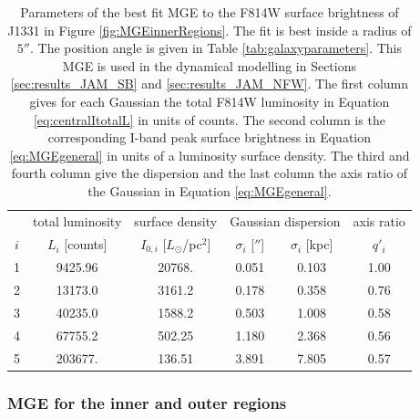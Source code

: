 \documentclass[useAMS,usenatbib]{mnras}
\begin{document}
\begin{table}
\centering
\caption{Parameters of the best fit MGE to the F814W surface brightness of J1331 in Figure \ref{fig:MGEinnerRegions}. The fit is best inside a radius of $5''$. The position angle is given in Table \ref{tab:galaxyparameters}. This MGE is used in the dynamical modelling in Sections \ref{sec:results_JAM_SB} and \ref{sec:results_JAM_NFW}. The first column gives for each Gaussian the total F814W luminosity in Equation \eqref{eq:centralItotalL} in units of counts. The second column is the corresponding I-band peak surface brightness in Equation \eqref{eq:MGEgeneral} in units of a luminosity surface density. The third and fourth column give the dispersion and the last column the axis ratio of the Gaussian in Equation \eqref{eq:MGEgeneral}.}
\begin{tabular}{cccccc}
\hline
 & total luminosity  & surface density & \multicolumn{2}{c}{Gaussian dispersion} & axis ratio\\
$i$  & $L_i$ [counts] & $I_{0,i}$ [$L_\odot$/pc$^2$] & $\sigma_i$ [$''$] & $\sigma_i$ [kpc] & $q'_i$\\\hline
1  &     9425.96 &      20768.  &  0.051   & 0.103  & 1.00\\
2  &    13173.0 &        3161.2 &  0.178   & 0.358  & 0.76\\
3  &    40235.0 &        1588.2 &  0.503   & 1.008  & 0.58\\
4  &    67755.2 &         502.25&  1.180   & 2.368  & 0.56\\
5  &    203677. &         136.51&  3.891   & 7.805  & 0.57\\\hline
\end{tabular}
\label{tab:MGEF814W}
\end{table}

\subsubsection{MGE for the inner and outer regions}
\end{document}
